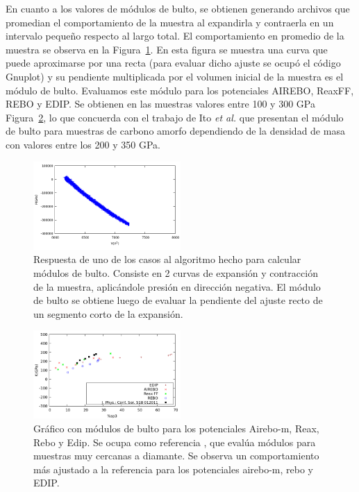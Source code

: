 \documentclass[aps,prl,twocolumn,superscriptaddress,groupedaddress]{revtex4}
\begin{document}
En cuanto a los valores de módulos de bulto, se obtienen generando archivos que promedian el comportamiento de la muestra al expandirla y contraerla en un intervalo pequeño respecto al largo total. El comportamiento en promedio de la muestra se observa en la Figura~\ref{fig:bulkproc}. En esta figura se muestra una curva que puede aproximarse por una recta (para evaluar dicho ajuste se ocupó el código Gnuplot\cite{Gnuplot}) y su pendiente multiplicada por el volumen inicial de la muestra es el módulo de bulto. Evaluamos este módulo para los potenciales AIREBO, ReaxFF, REBO y EDIP. Se obtienen en las muestras valores entre 100 y 300 GPa Figura~\ref{fig:bulkdata}, lo que concuerda con el trabajo de Ito {\it et al.} que presentan el módulo de bulto para muestras de carbono amorfo dependiendo de la densidad de masa con valores entre los 200 y 350 GPa.~\cite{RefBulk}
    \begin{figure}
        \includegraphics[width=0.5\textwidth]{bulk.png}
        \caption{Respuesta de uno de los casos al algoritmo hecho para calcular módulos de bulto. Consiste en 2 curvas de expansión y contracción de la muestra, aplicándole presión en dirección negativa. El módulo de bulto se obtiene luego de  evaluar la pendiente del ajuste recto de un segmento corto de la expansión.}
        \label{fig:bulkproc}
    \end{figure}
    \begin{figure}
        \includegraphics[width=0.5\textwidth]{databulk.png}
        \caption{Gráfico con módulos de bulto para los potenciales Airebo-m, Reax, Rebo y Edip. Se ocupa como referencia \cite{RefBulk}, que evalúa módulos para muestras muy cercanas a diamante. Se observa un comportamiento más ajustado a la referencia para los potenciales airebo-m, rebo y EDIP.}
        \label{fig:bulkdata}
    \end{figure}
\end{document}
